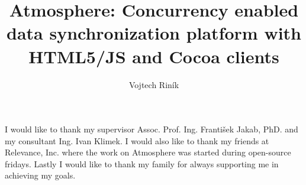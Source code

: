 \documentclass[]{tukethesis}
\author{Vojtech Riník}
\title{Atmosphere: Concurrency enabled data synchronization platform with HTML5/JS and Cocoa clients}
\subtitle{}
\begin{document}
\renewcommand\theHfigure{\theHsection.\arabic{figure}}
\renewcommand\theHtable{\theHsection.\arabic{table}}

\firstpage

\titlepage


% 
% 

\abstrakte %
\abstrakt %
\endabstract %

\assignthesis

\declaration

\acknowledgement %
I would like to thank my supervisor Assoc. Prof. Ing. František Jakab, PhD. and my consultant Ing. Ivan Klimek. I would also like to thank my friends at Relevance, Inc. where the work on Atmosphere was started during open-source fridays. Lastly I would like to thank my family for always supporting me in achieving my goals.
\endacknowledgement
\end{document}
